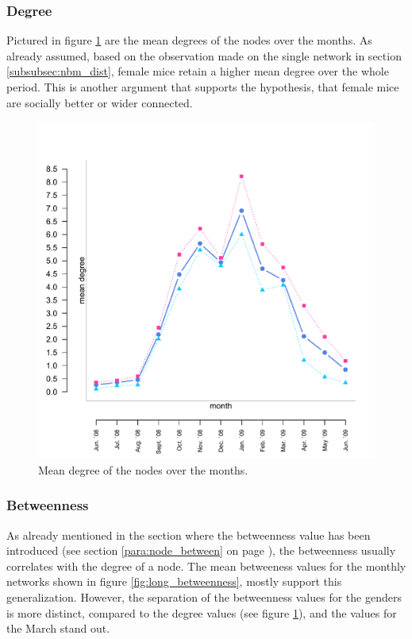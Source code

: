 \subsubsection*{Degree}

Pictured in figure \ref{fig:long_degree} are the mean degrees of the nodes over the months. As already assumed, based on the observation made on the single network in section \ref{subsubsec:nbm_dist}, female mice retain a higher mean degree over the whole period. This is another argument that supports the hypothesis, that female mice are socially better or wider connected.

\begin{figure}[htpb]
\begin{center}
  \includegraphics[width=.6\textwidth]{assets/pdf/long_degree.pdf}
  \caption[Mean degree of the nodes over the months]{Mean degree of the nodes over the months.}
  \label{fig:long_degree}
\end{center}
\end{figure} 


\subsubsection*{Betweenness}

As already mentioned in the section where the betweenness value has been introduced (see section \ref{para:node_between} on page \pageref{para:node_between}), the betweenness usually correlates with the degree of a node. The mean betweeness values for the monthly networks shown in figure \ref{fig:long_betweenness}, mostly support this generalization. However, the separation of the betweenness values for the genders is more distinct, compared to the degree values (see figure \ref{fig:long_degree}), and the values for the March stand out.   

